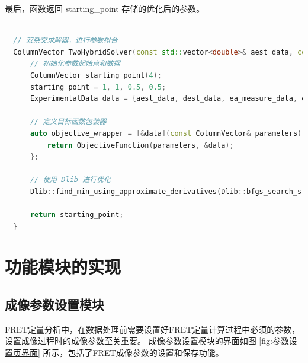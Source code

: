 最后，函数返回 {starting\_point} 存储的优化后的参数。
\begin{lstlisting}[language=C++, caption={双杂交求解器}, label={code:two_hybrid_solver}]
  
  // 双杂交求解器，进行参数拟合
  ColumnVector TwoHybridSolver(const std::vector<double>& aest_data, const std::vector<double>& dest_data, const std::vector<double>& ea_measure_data,const std::vector<double>& ed_measure_data) {
      // 初始化参数起始点和数据
      ColumnVector starting_point(4);
      starting_point = 1, 1, 0.5, 0.5;
      ExperimentalData data = {aest_data, dest_data, ea_measure_data, ed_measure_data};

      // 定义目标函数包装器
      auto objective_wrapper = [&data](const ColumnVector& parameters) {
          return ObjectiveFunction(parameters, &data);
      };
  
      // 使用 Dlib 进行优化
      Dlib::find_min_using_approximate_derivatives(Dlib::bfgs_search_strategy(), Dlib::objective_delta_stop_strategy(1e-7), objective_wrapper, starting_point, -1, 0.01);

      return starting_point;
  }
\end{lstlisting}  

\section{功能模块的实现}

\subsection{成像参数设置模块}
FRET定量分析中，在数据处理前需要设置好FRET定量计算过程中必须的参数，设置成像过程时的成像参数至关重要。
成像参数设置模块的界面如图 \ref{fig:参数设置页界面} 所示，包括了FRET成像参数的设置和保存功能。

